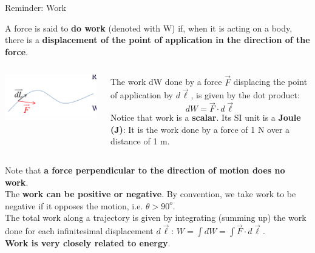 {
\reminderslide

%
%
%

\begin{frame}{Reminder: Work}

{\small

A force is said to {\bf do work} (denoted with W) if, when it is acting on a body,
there is a {\bf displacement of the point of application in the direction of the force}.
\vspace{0.3cm}

\begin{columns}
  \begin{column}{0.30\textwidth}
   \begin{center}
     \includegraphics[width=0.99\textwidth]{./images/schematics/work.png}\\
   \end{center}
  \end{column}
  \begin{column}{0.70\textwidth}
    The work dW done by a force $\vec{F}$ displacing the point of application by $d\vec{\ell}$,
    is given by the dot product:
    \begin{equation*}
      dW = \vec{F} \cdot d\vec{\ell}
    \end{equation*}
    Notice that work is a {\bf scalar}.
    Its SI unit is a {\bf Joule (J)}: It is the work done by a force of 1 N over a distance of 1 m.
  \end{column}
\end{columns}

\vspace{0.3cm}
Note that {\bf a force perpendicular to the direction of motion does no work}.\\
\vspace{0.2cm}
The {\bf work can be positive or negative}.
By convention, we take work to be negative if it opposes the motion, i.e. $\theta > 90^{o}$.\\
\vspace{0.2cm}
The total work along a trajectory is given by integrating (summing up) the work done for
each infinitesimal displacement $d\vec{\ell}$: $W = \int dW = \int \vec{F} \cdot d\vec{\ell}$.\\
\vspace{0.2cm}
{\bf Work is very closely related to energy}.
}
\end{frame}

} %


